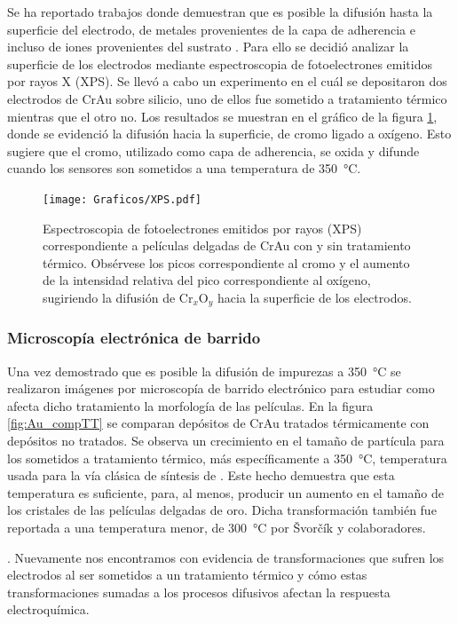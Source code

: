 {{			Se ha reportado trabajos donde demuestran que es posible la difusión hasta la superficie del electrodo, de metales provenientes de la capa de adherencia e incluso de iones provenientes del sustrato \cite{Alonso1990,Moody2003}. Para ello se decidió analizar la superficie de los electrodos mediante espectroscopia de fotoelectrones emitidos por rayos X (XPS). Se llevó a cabo un experimento en el cuál se depositaron dos electrodos de Cr\textbar Au sobre silicio, uno de ellos fue sometido a tratamiento térmico mientras que el otro no. Los resultados se muestran en el gráfico de la figura \ref{fig:XPS}, donde se evidenció la difusión hacia la superficie, de cromo ligado a oxígeno. Esto sugiere que el cromo, utilizado como capa de adherencia, se oxida y difunde cuando los sensores son sometidos a una temperatura de \SI{350}{\celsius}.

				\begin{figure}[ht!]
		 	       	\begin{center}
		 	       	\texttt{[image: Graficos/XPS.pdf]}
		        	\caption[XPS de películas delgadas de Cr\textbar Au]{Espectroscopia de fotoelectrones emitidos por rayos (XPS) correspondiente a películas delgadas de Cr\textbar Au con y sin tratamiento térmico. Obsérvese los picos correspondiente al cromo y el aumento de la intensidad relativa del pico correspondiente al oxígeno, sugiriendo la difusión de Cr$_x$O$_y$ hacia la superficie de los electrodos.}
		         	\label{fig:XPS}
		         	\end{center}
		     		\end{figure}

		\subsubsection{Microscopía electrónica de barrido}
			  		
			 Una vez demostrado que es posible la difusión de impurezas a \SI{350}{\celsius} se realizaron imágenes por microscopía de barrido electrónico para estudiar como afecta dicho tratamiento la morfología de las películas. En la figura \ref{fig:Au_compTT} se comparan depósitos de Cr\textbar Au tratados térmicamente con depósitos no tratados. Se observa un crecimiento en el tamaño de partícula para los sometidos a tratamiento térmico, más específicamente a \SI{350}{\celsius}, temperatura usada para la vía clásica de síntesis de \pdm. Este hecho demuestra que esta temperatura es suficiente, para, al menos, producir un aumento en el tamaño de los cristales de las películas delgadas de oro. Dicha transformación también fue reportada a una temperatura menor, de \SI{300}{\celsius} por \v{S}vor\v{c}\'ik y colaboradores.}\cite{Svorcik2010}. Nuevamente nos encontramos con evidencia de transformaciones que sufren los electrodos al ser sometidos a un tratamiento térmico y cómo estas transformaciones sumadas a los procesos difusivos afectan la respuesta electroquímica.

}
